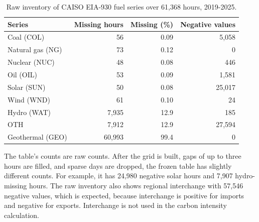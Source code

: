 \documentclass[10pt,journal,compsoc]{IEEEtran}
\begin{document}
\begin{table}[t]
\caption{Raw inventory of CAISO EIA-930 fuel series over 61,368 hours, 2019-2025.}
\label{tab:inventory}
\centering
\small
\begin{tabular}{@{}lrrr@{}}
\toprule
Series & Missing hours & Missing (\%) & Negative values \\
\midrule
Coal (COL) & 56 & 0.09 & 5,058 \\
Natural gas (NG) & 73 & 0.12 & 0 \\
Nuclear (NUC) & 48 & 0.08 & 446 \\
Oil (OIL) & 53 & 0.09 & 1,581 \\
Solar (SUN) & 50 & 0.08 & 25,017 \\
Wind (WND) & 61 & 0.10 & 24 \\
Hydro (WAT) & 7,935 & 12.9 & 185 \\
OTH & 7,912 & 12.9 & 27,594 \\
Geothermal (GEO) & 60,993 & 99.4 & 0 \\
\bottomrule
\end{tabular}
\end{table}

The table's counts are raw counts. After the grid is built, gaps of up to three hours are filled, and sparse days are dropped, the frozen table has slightly different counts. For example, it has 24,980 negative solar hours and 7,907 hydro-missing hours. The raw inventory also shows regional interchange with 57,546 negative values, which is expected, because interchange is positive for imports and negative for exports. Interchange is not used in the carbon intensity calculation.
\end{document}
